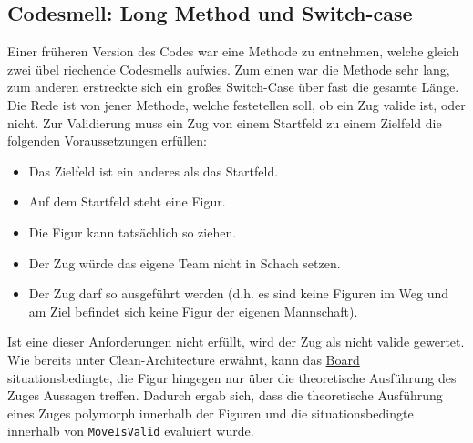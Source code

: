 \documentclass[
10pt, %
a4paper, %
oneside, %
headinclude,footinclude, %
BCOR5mm, %
]{scrartcl}
\begin{document}
\begin{onehalfspace}
\subsection{Codesmell: Long Method und Switch-case}
Einer früheren Version des Codes war eine Methode zu entnehmen, welche gleich zwei übel riechende Codesmells aufwies. Zum einen war die Methode sehr lang, zum anderen erstreckte sich ein großes Switch-Case über fast die gesamte Länge. Die Rede ist von jener Methode, welche festetellen soll, ob ein Zug valide ist, oder nicht. Zur Validierung muss ein Zug von einem Startfeld zu einem Zielfeld die folgenden Voraussetzungen erfüllen:
\begin{center}
	\begin{itemize}
		\item Das Zielfeld ist ein anderes als das Startfeld.
		\item Auf dem Startfeld steht eine Figur.
		\item Die Figur kann tatsächlich so ziehen.
		\item Der Zug würde das eigene Team nicht in Schach setzen.
		\item Der Zug darf so ausgeführt werden (d.h. es sind keine Figuren im Weg und am Ziel befindet sich keine Figur der eigenen Mannschaft).
	\end{itemize}
\end{center}
Ist eine dieser Anforderungen nicht erfüllt, wird der Zug als nicht valide gewertet. Wie bereits unter Clean-Architecture erwähnt, kann das \href{https://github.com/schmida736/Chess-AdvancedSE/blob/main/Chess-AdvancedSE/Game\%20Elements/Board.cs}{Board} situationsbedingte, die Figur hingegen nur über die theoretische Ausführung des Zuges Aussagen treffen. Dadurch ergab sich, dass die theoretische Ausführung eines Zuges polymorph innerhalb der Figuren und die situationsbedingte innerhalb von \texttt{MoveIsValid} evaluiert wurde. 
\vspace{0.5cm}


\end{onehalfspace}
\end{document}
